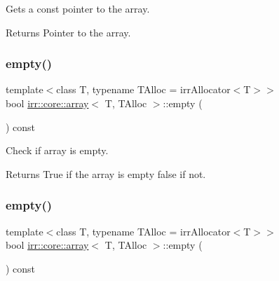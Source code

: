 Gets a const pointer to the array. 

\begin{DoxyReturn}{Returns}
Pointer to the array. 
\end{DoxyReturn}
\mbox{\label{classirr_1_1core_1_1array_a956ee1019455016e21e218b61f6371ca}} 
\subsubsection{\texorpdfstring{empty()}{empty()}\hspace{0.1cm}{\footnotesize\ttfamily [1/2]}}
{\footnotesize\ttfamily template$<$class T, typename T\+Alloc = irr\+Allocator$<$\+T$>$$>$ \\
bool \hyperlink{classirr_1_1core_1_1array}{irr\+::core\+::array}$<$ T, T\+Alloc $>$\+::empty (\begin{DoxyParamCaption}{ }\end{DoxyParamCaption}) const\hspace{0.3cm}{\ttfamily [inline]}}



Check if array is empty. 

\begin{DoxyReturn}{Returns}
True if the array is empty false if not. 
\end{DoxyReturn}
\mbox{\label{classirr_1_1core_1_1array_a956ee1019455016e21e218b61f6371ca}} 
\subsubsection{\texorpdfstring{empty()}{empty()}\hspace{0.1cm}{\footnotesize\ttfamily [2/2]}}
{\footnotesize\ttfamily template$<$class T, typename T\+Alloc = irr\+Allocator$<$\+T$>$$>$ \\
bool \hyperlink{classirr_1_1core_1_1array}{irr\+::core\+::array}$<$ T, T\+Alloc $>$\+::empty (\begin{DoxyParamCaption}{ }\end{DoxyParamCaption}) const\hspace{0.3cm}{\ttfamily [inline]}}



